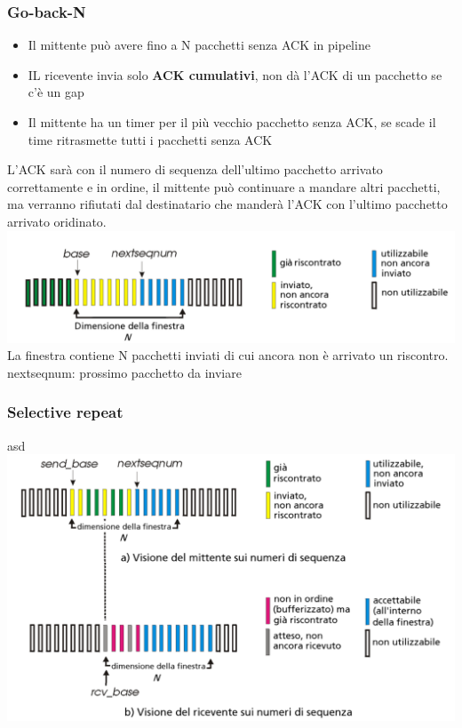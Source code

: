 \subsubsection*{Go-back-N}
\begin{itemize}
  \item Il mittente può avere fino a N pacchetti senza ACK in pipeline
  \item IL ricevente invia solo \textbf{ACK cumulativi}, non dà l'ACK di un pacchetto se c'è un gap
  \item Il mittente ha un timer per il più vecchio pacchetto senza ACK, se scade il time ritrasmette tutti i pacchetti senza ACK
\end{itemize}
L'ACK sarà con il numero di sequenza dell'ultimo pacchetto arrivato correttamente e in ordine, il mittente può continuare a mandare altri pacchetti, ma verranno rifiutati dal destinatario che manderà l'ACK con l'ultimo pacchetto arrivato oridinato. \newline
\includegraphics[width=\textwidth]{./img/gobackn.png} \newline
La finestra contiene N pacchetti inviati di cui ancora non è arrivato un riscontro.
nextseqnum: prossimo pacchetto da inviare

\subsubsection*{Selective repeat}
asd\newline
\includegraphics[width=\textwidth]{./img/ripetizioneselettiva.png} 

